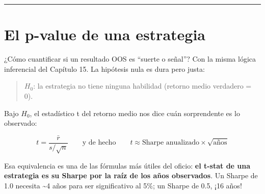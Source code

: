 \documentclass[
  spanish,
  letterpaper,
  DIV=11,
  numbers=noendperiod]{scrreprt}
\begin{document}
\begin{center}\rule{0.5\linewidth}{0.5pt}\end{center}

\chapter{El p-value de una
estrategia}\label{el-p-value-de-una-estrategia}

¿Cómo cuantificar si un resultado OOS es ``suerte o señal''? Con la
misma lógica inferencial del Capítulo 15. La hipótesis nula es dura pero
justa:

\begin{quote}
\(H_0\): la estrategia no tiene ninguna habilidad (retorno medio
verdadero = 0).
\end{quote}

Bajo \(H_0\), el estadístico t del retorno medio nos dice cuán
sorprendente es lo observado:

\[t = \frac{\bar{r}}{s / \sqrt{n}} \qquad\text{y de hecho}\qquad t \approx \text{Sharpe anualizado} \times \sqrt{\text{años}}\]

Esa equivalencia es una de las fórmulas más útiles del oficio:
\textbf{el t-stat de una estrategia es su Sharpe por la raíz de los años
observados}. Un Sharpe de 1.0 necesita \textasciitilde4 años para ser
significativo al 5\%; un Sharpe de 0.5, ¡16 años!
\end{document}
